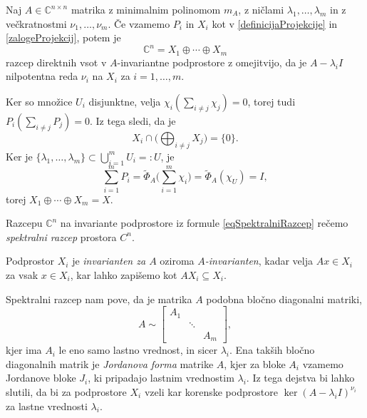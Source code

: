 \documentclass[mat1]{fmfdelo}
\newcommand{\C}{\mathbb C}
\begin{document}
\begin{trditev}\label{trditevSpektralniRazcep}
    Naj $A \in \C^{n \times n}$ matrika z minimalnim polinomom $m_A$, z ničlami $\lambda_1, \ldots, \lambda_m$ in z večkratnostmi $\nu_1, \ldots, \nu_m$. Če vzamemo $P_i$ in $X_i$ kot v \eqref{definicijaProjekcije} in \eqref{zalogeProjekcij}, potem je
    \begin{equation}\label{eqSpektralniRazcep}
        \C^n = X_1 \oplus \cdots \oplus X_m
    \end{equation}
    razcep direktnih vsot v $A$-invariantne podprostore z omejitvijo, da je $A - \lambda_i I$ nilpotentna reda $\nu_i$ na $X_i$ za $i = 1, \ldots, m$.
\end{trditev}
\begin{dokaz}
    Ker so množice $U_i$ disjunktne, velja $\chi_i(\sum_{i \neq j} \chi_j) = 0$, torej tudi \\ $P_i(\sum_{i \neq j} P_j) = 0$. Iz tega sledi, da je
    \begin{equation}
        X_i \cap \big(\bigoplus_{i \neq j} X_j\big) = \{0\}.
    \end{equation}
    Ker je $\{\lambda_1, \ldots, \lambda_m\} \subset \bigcup_{i = 1}^m U_i =: U$, je
    \begin{equation}
        \sum_{i = 1}^m P_i = \widetilde{\Phi}_A \big(\sum_{i=1}^m \chi_i \big) = \widetilde{\Phi}_A (\chi_U) = I,
    \end{equation}
    torej $X_1 \oplus \cdots \oplus X_m = X$.
\end{dokaz}
\begin{definicija}
    Razcepu $\C^n$ na invariante podprostore iz formule \eqref{eqSpektralniRazcep} rečemo \emph{spektralni razcep} prostora $C^n$. 
\end{definicija}
\begin{opomba}
    Podprostor $X_i$ je \emph{invarianten za $A$} oziroma \emph{$A$-invarianten}, kadar velja $A x \in X_i$ za vsak $x \in X_i$, kar lahko zapišemo kot $A X_i \subseteq X_i$.
\end{opomba}
Spektralni razcep nam pove, da je matrika $A$ podobna bločno diagonalni matriki,
\begin{equation}
    A \sim
    \begin{bmatrix}
       A_1 & & \\
       & \ddots & \\
       & & A_m 
    \end{bmatrix},
\end{equation}
kjer ima $A_i$ le eno samo lastno vrednost, in sicer $\lambda_i$. Ena takših bločno diagonalnih matrik je \emph{Jordanova forma} matrike $A$, kjer za bloke $A_i$ vzamemo Jordanove bloke $J_i$, ki pripadajo lastnim vrednostim $\lambda_i$. Iz tega dejstva bi lahko slutili, da bi za podprostore $X_i$ vzeli kar korenske podprostore $\ker (A - \lambda_i I)^{\nu_i}$ za lastne vrednosti $\lambda_i$.
\end{document}

